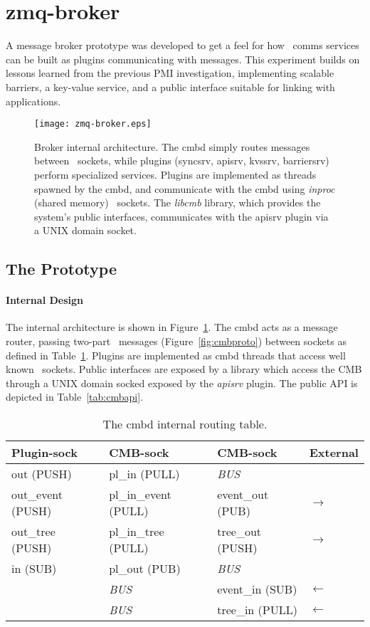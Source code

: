 \section{zmq-broker}

A message broker prototype was developed to get a feel for how \ngrm\ 
comms services can be built as plugins communicating with messages.
This experiment builds on lessons learned from the previous PMI
investigation, implementing scalable barriers, a key-value service,
and a public interface suitable for linking with applications.

\begin{figure}
\centering
\texttt{[image: zmq-broker.eps]}
\caption{Broker internal architecture.  The cmbd simply routes messages
between \zMQ\ sockets, while plugins (syncsrv, apisrv, kvssrv, barriersrv)
perform specialized services.
Plugins are implemented as threads spawned by the cmbd, and communicate
with the cmbd using {\em inproc} (shared memory) \zMQ\ sockets.
The {\em libcmb} library, which provides the system's public interfaces,
communicates with the apisrv plugin via a UNIX domain socket.}
\label{fig:cmbint}
\end{figure}

\subsection{The Prototype}

\paragraph {Internal Design}
The internal architecture is shown in Figure~\ref{fig:cmbint}.
The cmbd acts as a message router, passing two-part \zMQ\ messages
(Figure~\ref{fig:cmbproto}) between sockets as defined in
Table~\ref{tab:cmbrouting}.
Plugins are implemented as cmbd threads that access well known \zMQ\ sockets.
Public interfaces are exposed by a library which access the CMB through
a UNIX domain socked exposed by the {\em apisrv} plugin.
The public API is depicted in Table~\ref{tab:cmbapi}.

\begin{table}
\centering
\begin{tabular}{|l|l|l|l|}\hline
\textbf{Plugin-sock} & \textbf{CMB-sock} & \textbf{CMB-sock}
					 & \textbf{External} \\
\hline
out (PUSH)		& pl\_in (PULL)	& {\em BUS} & \\
out\_event (PUSH)  & pl\_in\_event (PULL) & event\_out (PUB) & $\rightarrow$ \\
out\_tree (PUSH) & pl\_in\_tree	(PULL) & tree\_out (PUSH) & $\rightarrow$ \\
in (SUB)	& pl\_out (PUB)	& {\em BUS}     & \\
\hline
		& {\em BUS}	& event\_in (SUB) & $\leftarrow$ \\
		& {\em BUS}	& tree\_in (PULL) & $\leftarrow$ \\
\hline
\end{tabular}
\caption{The cmbd internal routing table.}
\label{tab:cmbrouting}
\end{table}

